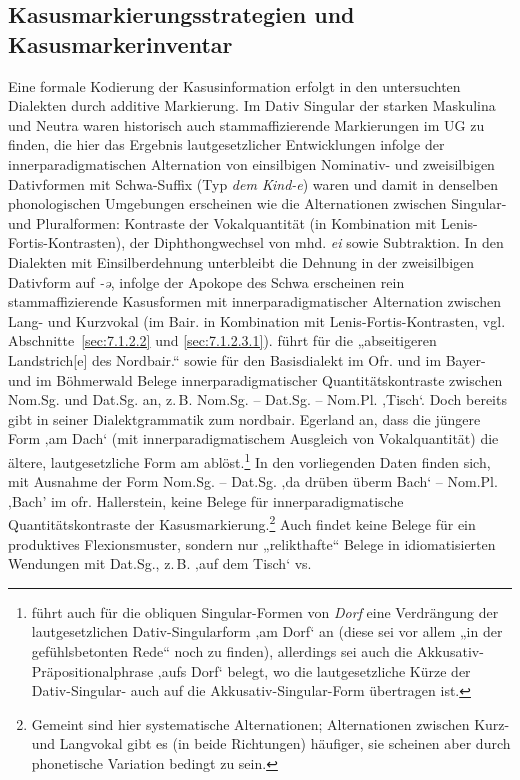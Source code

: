 \subsection{Kasusmarkierungsstrategien und Kasusmarkerinventar}\label{sec:7.2.1}
\begin{sloppypar}
Eine formale Kodierung der Kasusinformation erfolgt in den untersuchten Dialekten durch additive Markierung. Im Dativ Singular der starken Maskulina und Neutra waren historisch auch stammaffizierende Markierungen im UG zu finden, die hier das Ergebnis lautgesetzlicher Entwicklungen infolge der innerparadigmatischen Alternation von einsilbigen Nominativ- und zweisilbigen Dativformen mit Schwa-Suffix (Typ \textit{dem Kind-e}) waren und damit in denselben phonologischen Umgebungen erscheinen wie die Alternationen zwischen Singular- und Pluralformen: Kontraste der Vokalquantität (in Kombination mit Lenis-Fortis-Kontrasten), der Diphthongwechsel von mhd. \textit{ei} sowie Subtraktion. In den Dialekten mit Einsilberdehnung unterbleibt die Dehnung in der zweisilbigen Dativform auf \textit{{}-ə}, infolge der Apokope des Schwa erscheinen rein stammaffizierende Kasusformen mit innerparadigmatischer Alternation zwischen Lang- und Kurzvokal (im Bair. in Kombination mit Lenis-Fortis-Kontrasten, vgl. Abschnitte~\ref{sec:7.1.2.2} und \ref{sec:7.1.2.3.1}). \citet[§34k3]{Kranzmayer1956} führt für die „abseitigeren Landstrich[e] des Nordbair.“ sowie für den Basisdialekt im Ofr. und im Bayer- und im Böhmerwald Belege innerparadigmatischer Quantitätskontraste zwischen Nom.Sg. und Dat.Sg. an, z.\,B. Nom.Sg.  -- Dat.Sg.  -- Nom.Pl.  ‚Tisch‘. Doch bereits \citet[51]{Roth1940} gibt in seiner Dialektgrammatik zum nordbair. Egerland an, dass die jüngere Form   ‚am Dach‘ (mit innerparadigmatischem Ausgleich von Vokalquantität) die ältere, lautgesetzliche Form am  ablöst.\footnote{\citet[71]{Roth1940} führt auch für die obliquen Singular-Formen von \textit{Dorf} eine Verdrängung der lautgesetzlichen Dativ-Singularform  ‚am Dorf‘ an (diese sei vor allem „in der gefühlsbetonten Rede“ noch zu finden), allerdings sei auch die Akkusativ-Präpositionalphrase   ‚aufs Dorf‘ belegt, wo die lautgesetzliche Kürze der Dativ-Singular- auch auf die Akkusativ-Singular-Form übertragen ist.} In den vorliegenden Daten finden sich, mit Ausnahme der Form Nom.Sg.  -- Dat.Sg.     ‚da drüben überm Bach‘ -- Nom.Pl.  ‚Bach’ im ofr. Hallerstein, keine Belege für innerparadigmatische Quantitätskontraste der Kasusmarkierung.\footnote{Gemeint sind hier systematische Alternationen; Alternationen zwischen Kurz- und Langvokal gibt es (in beide Richtungen) häufiger, sie scheinen aber durch phonetische Variation bedingt zu sein.}  Auch \citet[94--95]{Rowley1997} findet keine Belege für ein produktives Flexionsmuster, sondern nur „relikthafte“ Belege in idiomatisierten Wendungen mit Dat.Sg., z.\,B.   ‚auf dem Tisch‘ vs.   
\end{sloppypar}
